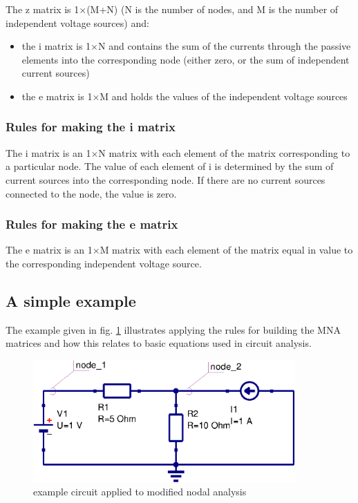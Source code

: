 The z matrix is 1$\times$(M+N) (N is the number of nodes, and M is the
number of independent voltage sources) and:

\begin{itemize}
\item
the i matrix is 1$\times$N and contains the sum of the currents through the
passive elements into the corresponding node (either zero, or the sum
of independent current sources)
\item
the e matrix is 1$\times$M and holds the values of the independent
voltage sources
\end{itemize}

\subsubsection{Rules for making the i matrix}

The i matrix is an 1$\times$N matrix with each element of the matrix
corresponding to a particular node.  The value of each element of i is
determined by the sum of current sources into the corresponding node.
If there are no current sources connected to the node, the value is
zero.

\subsubsection{Rules for making the e matrix}

The e matrix is an 1$\times$M matrix with each element of the matrix
equal in value to the corresponding independent voltage source.

\subsection{A simple example}

The example given in fig. \ref{fig:MNAexample} illustrates applying
the rules for building the MNA matrices and how this relates to basic
equations used in circuit analysis.

\begin{figure}[ht]
\begin{center}
\includegraphics[width=10cm]{MNAexample}
\end{center}
\caption{example circuit applied to modified nodal analysis}
\label{fig:MNAexample}
\end{figure}
\FloatBarrier

